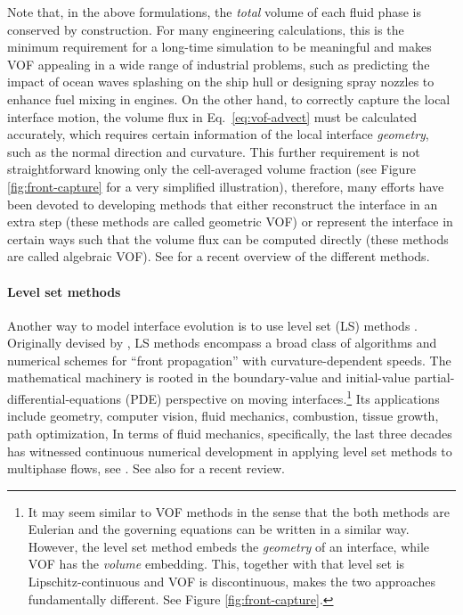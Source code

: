 Note that, in the above formulations, the \emph{total} volume of each fluid phase is conserved by construction.
For many engineering calculations, this is the minimum requirement for a long-time simulation to be meaningful and makes VOF appealing in a wide range of industrial problems, such as predicting the impact of ocean waves splashing on the ship hull or designing spray nozzles to enhance fuel mixing in engines.
On the other hand, to correctly capture the local interface motion, the volume flux in Eq.\ \eqref{eq:vof-advect} must be calculated accurately, which requires certain information of the local interface \emph{geometry}, such as the normal direction and curvature.
This further requirement is not straightforward knowing only the cell-averaged volume fraction (see Figure \ref{fig:front-capture} for a very simplified illustration), therefore, many efforts have been devoted to developing methods that either reconstruct the interface in an extra step (these methods are called geometric VOF) or represent the interface in certain ways such that the volume flux can be computed directly (these methods are called algebraic VOF). See \cite{mirjalili_jain_dodd_2017a} for a recent overview of the different methods.


\medskip
\paragraph{\bf Level set methods}

Another way to model interface evolution is to use level set (LS) methods \citep{sethian_1999a}.
Originally devised by \cite{Osher_Sethian_levelset}, LS methods encompass a broad class of algorithms and numerical schemes for ``front propagation'' with curvature-dependent speeds.
The mathematical machinery is rooted in the boundary-value and initial-value partial-differential-equations (PDE) perspective on moving interfaces.\footnote{It may seem similar to VOF methods in the sense that the both methods are Eulerian and the governing equations can be written in a similar way. However, the level set method embeds the \emph{geometry} of an interface, while VOF has the \emph{volume} embedding. This, together with that level set is Lipschitz-continuous and VOF is discontinuous, makes the two approaches fundamentally different. See Figure \ref{fig:front-capture}.}
Its applications include geometry, computer vision, fluid mechanics, combustion, tissue growth, path optimization, \etc
In terms of fluid mechanics, specifically, the last three decades has witnessed continuous numerical development in applying level set methods to multiphase flows, see \eg \cite{Mulder_JCP_1992, Sussman_JCP_1994, Sussman_JCP_2000, Enright_JCP_2002, Olsson_JCP_2005, Marchandise_JCP_2007, Desjardins_JCP_2008, Desjardins_JCP_2009, Aanjaneya_JCP_2013, Luo_JCP_2015, ICLS}. See also \cite{Gibou_Fedkiv_Osher} for a recent review.

